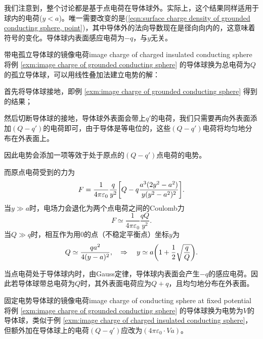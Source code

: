 我们注意到，整个讨论都是基于点电荷在导体球外。实际上，这个结果同样适用于球内的电荷($y<a$)。唯一需要改变的是(\ref{eqn:surface charge density of grounded conducting sphere, point})，其中导体外的法向导数现在是径向向内的，这意味着符号的变化。导体球内表面感应电荷为$-q$，与$y$无关。
\begin{example}{带电孤立导体球的镜像电荷}{image charge of charged insulated conducting sphere}
    将例 \ref{exm:image charge of grounded conducting sphere} 的导体球换为总电荷为$Q$的孤立导体球，可以用线性叠加法建立电势的解：
    \begin{compactenum}
        \item 首先将导体球接地，即例 \ref{exm:image charge of grounded conducting sphere} 得到的结果；
        \item 然后切断导体球的接地，导体球外表面会带上$q'$的电荷，我们只需要再向外表面添加$(Q-q')$的电荷即可，由于导体是等电位的，这些$(Q-q')$电荷将均匀地分布在外表面上。
    \end{compactenum}
    因此电势会添加一项等效于处于原点的$(Q-q')$点电荷的电势。
    
    而原点电荷受到的力为
    \begin{equation}
        F=\frac1{4\pi\varepsilon_0}\frac q{y^2}\biggl[Q-q\frac{a^3(2y^2-a^2)}{y(y^2-a^2)^2}\biggr].
    \end{equation}
    当$y\gg a$时，电场力会退化为两个点电荷之间的Coulomb力
    \[
        F\simeq\frac1{4\pi\varepsilon_0}\frac{qQ}{y^2}.
    \]
    当$Q\gg q$时，相互作为用0的点（不稳定平衡点）坐标$y$为
    \begin{equation}
        Q\simeq\frac{qa^2}{4(y-a)^2},\quad\Rightarrow\quad y\simeq a\biggl(1+\frac12\sqrt{\frac qQ}\biggr).
    \end{equation}
\end{example}
当点电荷处于导体球内时，由Gauss定律，导体球内表面会产生$-q$的感应电荷。因此若导体球带总电荷为$Q$时，其外表面电荷应为$Q+q$，且均匀地分布在外表面。
\begin{example}{固定电势导体球的镜像电荷}{image charge of conducting sphere at fixed potential}
    将例 \ref{exm:image charge of grounded conducting sphere} 的导体球换为电势为$V$的导体球，类似于例 \ref{exm:image charge of charged insulated conducting sphere}，但额外加在导体球上的电荷$(Q-q')$应改为$(4\pi\varepsilon_0\cdot Va)$。
\end{example}
